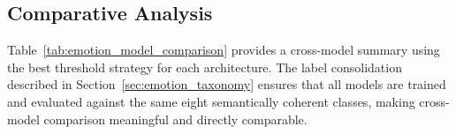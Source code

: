 \subsection{Comparative Analysis}
Table~\ref{tab:emotion_model_comparison} provides a cross-model summary using the best threshold strategy for each architecture. The label consolidation described in Section~\ref{sec:emotion_taxonomy} ensures that all models are trained and evaluated against the same eight semantically coherent classes, making cross-model comparison meaningful and directly comparable.

\begin{table}[htbp]
\centering
\small
\caption{Cross-model comparison on the test set (best threshold strategy per model).}
\label{tab:emotion_model_comparison}
\end{table}
